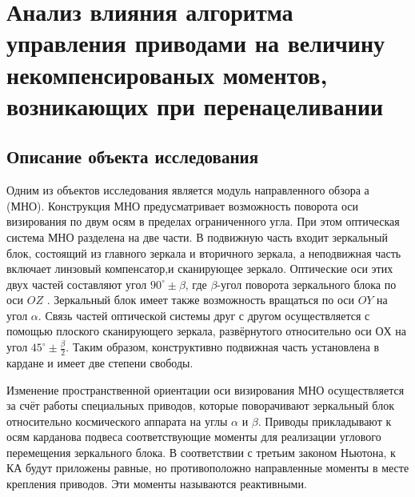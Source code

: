 \chapter{Анализ влияния алгоритма управления приводами на величину некомпенсированых моментов, возникающих при перенацеливании}\label{ch:ch2}
\section{Описание объекта исследования}\label{sec:ch2/sec1}

Одним из объектов исследования является модуль направленного обзора а 
(МНО). Конструкция МНО предусматривает возможность поворота оси 
визирования по двум осям в пределах ограниченного угла. При этом оптическая 
система МНО разделена на две части. В подвижную часть входит зеркальный блок, состоящий из главного зеркала  и вторичного зеркала, а неподвижная часть включает линзовый компенсатор,и сканирующее зеркало. Оптические оси этих двух частей составляют угол $90^\circ \pm \beta$, где $\beta$-угол поворота зеркального блока по оси $OZ$ . Зеркальный блок имеет также возможность вращаться по оси $OY$ на угол $\alpha$. Связь частей оптической системы друг с другом осуществляется с помощью плоского сканирующего зеркала, развёрнутого относительно оси $ОХ$ на угол $45^\circ \pm \frac{\beta}{2}$. Таким образом, конструктивно подвижная часть установлена в кардане и имеет две степени свободы.


Изменение пространственной ориентации оси визирования МНО осуществляется за счёт работы специальных приводов, которые поворачивают зеркальный блок относительно космического аппарата на углы $\alpha$ и $\beta$.
Приводы прикладывают к осям карданова подвеса соответствующие моменты для реализации углового перемещения зеркального блока. В соответствии с третьим законом Ньютона, к КА будут приложены равные, но противоположно направленные моменты в месте крепления приводов. Эти моменты называются реактивными.

